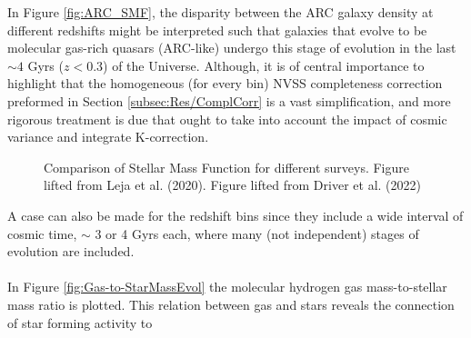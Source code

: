 In Figure \ref{fig:ARC_SMF}, the disparity between the ARC galaxy density at different redshifts might be interpreted such that galaxies that evolve to be molecular gas-rich quasars (ARC-like) undergo this stage of evolution in the last $\sim 4$ Gyrs ($z<0.3$) of the Universe. Although, it is of central importance to highlight that the homogeneous (for every bin) NVSS completeness correction preformed in Section \ref{subsec:Res/ComplCorr} is a vast simplification, and more rigorous treatment is due that ought to take into account the impact of cosmic variance and integrate K-correction\cite{Kcorr2002}. \\
\begin{figure}[htbp]
    \caption{Comparison of Stellar Mass Function for different surveys. Figure lifted from Leja et al. (2020)\cite{Leja2020}. Figure lifted from Driver et al. (2022)\cite{Driver2022} }
    \label{fig:SMF_Surv}
\end{figure}
A case can also be made for the redshift bins since they include a wide interval of cosmic time, $\sim$ 3 or 4 Gyrs each, where many (not independent) stages of evolution are included.  \\ \\
In Figure \ref{fig:Gas-to-StarMassEvol} the molecular hydrogen gas mass-to-stellar mass ratio is plotted. This relation between gas and stars reveals the connection of star forming activity to
